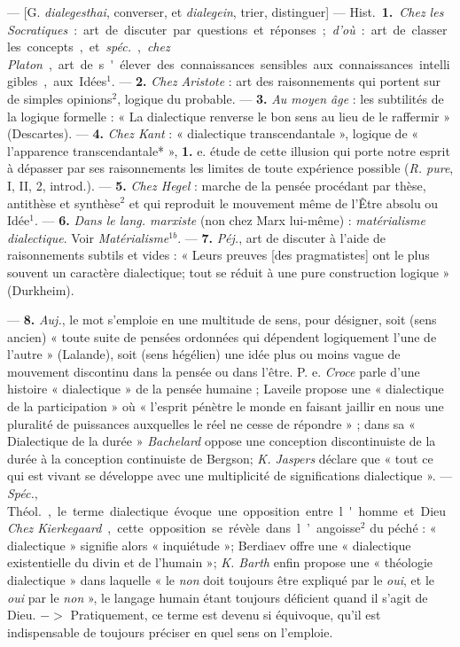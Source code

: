 \begin{itemize}[leftmargin=1cm, label=, itemsep=1pt]
 — [G. {\it dialegesthai}, converser, et {\it dialegein}, trier, distinguer]
— \si{Hist.} {\bf 1.} {\it Chez les Socratiques} : art
de discuter par questions et réponses ; {\it d'où} : art de classer les concepts,
et {\it spéc.}, {\it chez Platon}, art de s'élever
des connaissances sensibles aux
connaissances intelligibles, aux
Idées$^1$. — {\bf 2.} {\it Chez Aristote} : art des
raisonnements qui portent sur de
simples opinions$^2$, logique du probable. — {\bf 3.} {\it Au moyen âge} : les subtilités de la logique formelle : « La
dialectique renverse le bon sens au
lieu de le raffermir » (Descartes). —
 {\bf 4.} {\it Chez Kant} : « dialectique transcendantale », logique de « l’apparence transcendantale* », {\bf 1.} e. étude
de cette illusion qui porte notre
esprit à dépasser par ses raisonnements les limites de toute expérience possible ({\it R. pure}, I, II, 2,
introd.). — {\bf 5.} {\it Chez Hegel} : marche de
la pensée procédant par thèse, antithèse et synthèse$^2$ et qui reproduit
le mouvement même de l’Être
absolu ou Idée$^1$. — {\bf 6.} {\it Dans le lang.
marxiste} (non chez Marx lui-même) :
{\it matérialisme dialectique}. Voir {\it Matérialisme}$^{1b}$. — {\bf 7.} {\it Péj.}, art de discuter
à l’aide de raisonnements subtils et
vides : « Leurs preuves [des pragmatistes] ont le plus souvent un caractère
dialectique; tout se réduit à une pure
construction logique » (Durkheim).

— {\bf 8.} {\it Auj.}, le mot s'emploie en
une multitude de sens, pour désigner, soit (sens ancien) « toute suite
de pensées ordonnées qui dépendent
logiquement l’une de l’autre » (Lalande), soit (sens hégélien) une idée
plus ou moins vague de mouvement
discontinu dans la pensée ou dans
l’être. P. e. {\it Croce} parle d’une histoire
« dialectique » de la pensée humaine ;
Laveile propose une « dialectique de
la participation » où « l'esprit pénètre
le monde en faisant jaillir en nous
une pluralité de puissances auxquelles le réel ne cesse de répondre » ;
dans sa « Dialectique de la durée »
{\it Bachelard} oppose une conception
discontinuiste de la durée à la conception continuiste de Bergson;
{\it K. Jaspers} déclare que « tout ce qui
est vivant se développe avec une
multiplicité de significations dialectique ». — {\it Spéc.}, \si{Théol.}, le terme
dialectique évoque une opposition
entre l'homme et Dieu. {\it Chez Kierkegaard}, cette opposition se révèle
dans l’angoisse$^2$ du péché : « dialectique » signifie alors « inquiétude »;
Berdiaev offre une « dialectique
existentielle du divin et de l’humain »; {\it K. Barth} enfin propose une
« théologie dialectique » dans laquelle « le {\it non} doit toujours être
expliqué par le {\it oui}, et le {\it oui} par le
{\it non} », le langage humain étant toujours déficient quand il s’agit de
Dieu. $->$ Pratiquement, ce terme
est devenu si équivoque, qu'il est
indispensable de toujours préciser
en quel sens on l’emploie.


\end{itemize}
